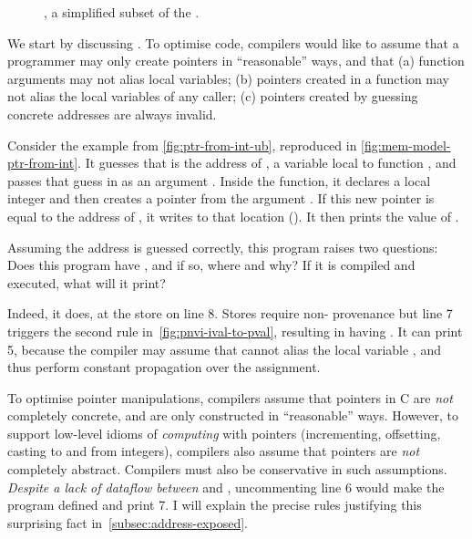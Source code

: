 \begin{figure}
    \ContinuedFloat%
    \small%
    \raggedright%
    \begingroup%
    \renewcommand{\cnprodline}{\cnprodlinecomment}
    \grammartabularSTY{%
        \cnmemop{}\cnafterlastrule{}
    }
    \endgroup%
    \caption{ , a simplified subset of
        the  .}\label{fig:mem-op-intf}
\end{figure}

We start by discussing . To optimise code, compilers would
like to assume that a programmer may only create pointers in ``reasonable''
ways, and that (a) function arguments may not alias local variables; (b)
pointers created in a function may not alias the local variables of any caller;
(c) pointers created by guessing concrete addresses are always invalid.

Consider the example from \cref{fig:ptr-from-int-ub}, reproduced in
\cref{fig:mem-model-ptr-from-int}.  It guesses that  is
the address of , a variable local to function , and
passes that guess in as an argument . Inside the %
function, it declares a local integer  and then creates a pointer
 from the argument . If this new pointer is equal to the
address of , it writes to that location (). It then prints the value of .

Assuming the address is guessed correctly, this program raises two questions:
Does this program have , and if so, where and why? If
it is compiled and executed, what will it print?

Indeed, it does, at the store on line 8. Stores require non-
provenance but line 7 triggers the second rule in~\cref{fig:pnvi-ival-to-pval},
resulting in  having  . It can print 5,
because the compiler may assume that  cannot alias the local
variable , and thus perform constant propagation over the
assignment.

To optimise pointer manipulations, compilers assume that pointers in C are
\emph{not} completely concrete, and are only constructed in ``reasonable''
ways. However, to support low-level idioms of \emph{computing} with pointers
(incrementing, offsetting, casting to and from integers), compilers also assume
that pointers are \emph{not} completely abstract.  Compilers must also be
conservative in such assumptions. \emph{Despite a lack of dataflow between}
 and , uncommenting line 6 would make the program defined
and print 7. I will explain the precise rules justifying this surprising fact
in~\cref{subsec:address-exposed}.
\begin{marginfigure}
    \raggedright%
    \caption{A modified version of example
        pointer\_from\_integer\_1ie.c
        from~\textcite{memarian2019exploring}.}\label{fig:mem-model-ptr-from-int}
\end{marginfigure}%


